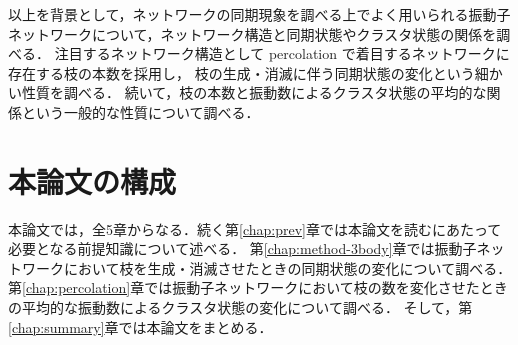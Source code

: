 \documentclass[../main]{subfiles}
\begin{document}
以上を背景として，ネットワークの同期現象を調べる上でよく用いられる振動子ネットワークについて，ネットワーク構造と同期状態やクラスタ状態の関係を調べる．
注目するネットワーク構造として percolation で着目するネットワークに存在する枝の本数を採用し，
枝の生成・消滅に伴う同期状態の変化という細かい性質を調べる．
続いて，枝の本数と振動数によるクラスタ状態の平均的な関係という一般的な性質について調べる．
\section{本論文の構成}
\label{chap:intro-config}
本論文では，全5章からなる．続く第\ref{chap:prev}章では本論文を読むにあたって必要となる前提知識について述べる．
第\ref{chap:method-3body}章では振動子ネットワークにおいて枝を生成・消滅させたときの同期状態の変化について調べる．
第\ref{chap:percolation}章では振動子ネットワークにおいて枝の数を変化させたときの平均的な振動数によるクラスタ状態の変化について調べる．
そして，第\ref{chap:summary}章では本論文をまとめる．
\end{document}

